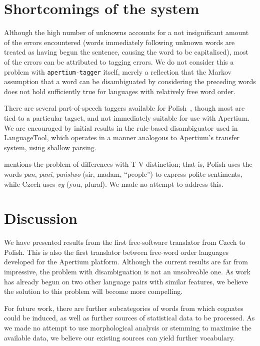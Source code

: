 \documentclass[11pt]{article}
\begin{document}
\section{Shortcomings of the system}

Although the high number of unknowns accounts for a not insignificant amount
of the errors encountered (words immediately following unknown words are treated
as having begun the sentence, causing the word to be capitalised),
most of the errors can be attributed to tagging errors. We do not consider this a problem
with {\tt\small apertium-tagger} itself, merely a reflection that the Markov
assumption that a word can be disambiguated by considering the preceding words 
does not hold sufficiently true for languages with relatively free word order.

There are several part-of-speech taggers available for Polish~\citep{Piasecki:07TQ, Acedanski09}, 
though most are tied to a particular tagset, and not immediately suitable for use
with Apertium. We are encouraged by initial results in the rule-based 
disambiguator used in LanguageTool, which operates in a manner analogous to
Apertium's transfer system, using shallow parsing.

\cite{Debowski02} mentions the problem of differences with T-V distinction; that is,
Polish uses the words \emph{pan}, \emph{pani}, \emph{państwo} (sir, madam, ``people'')
to express polite sentiments, while Czech uses \emph{vy} (you, plural). We made no
attempt to address this.

\section{Discussion}

We have presented results from the first free-software translator from Czech to 
Polish. This is also the first translator between free-word order languages
developed for the Apertium platform. Although the current results are far from
impressive, the problem with disambiguation is not an unsolveable one. As
work has already begun on two other language pairs with similar features, we
believe the solution to this problem will become more compelling.

For future work, there are further subcategories of words from which cognates
could be induced, as well as further sources of statistical data to be
processed. As we made no attempt to use morphological analysis or stemming
to maximise the available data, we believe our existing sources can yield
further vocabulary.
\end{document}
